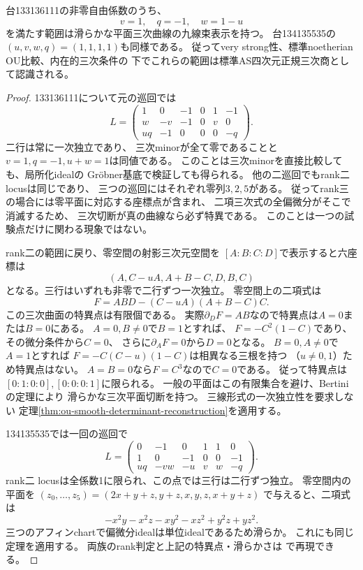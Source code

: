\begin{proposition}[全零空間の次元が増える四零係数型の認識]
\label{prop:ou-four-zero-rank-two-recognition}
台133136111の非零自由係数のうち、
\[
 v=1,\quad q=-1,\quad w=1-u
\]
を満たす範囲は滑らかな平面三次曲線の九線束表示を持つ。
台134135535の$(u,v,w,q)=(1,1,1,1)$も同様である。
従ってvery strong性、標準noetherian OU比較、内在的三次条件の
下でこれらの範囲は標準AS四次元正規三次商として認識される。
\end{proposition}
\begin{proof}
133136111について元の巡回では
\[
 L=\begin{pmatrix}
 1&0&-1&0&1&-1\\
 w&-v&-1&0&v&0\\
 uq&-1&0&0&0&-q
 \end{pmatrix}.
\]
二行は常に一次独立であり、
三次minorが全て零であることと
$v=1,q=-1,u+w=1$は同値である。
このことは三次minorを直接比較しても、局所化idealの
Gröbner基底で検証しても得られる。
他の二巡回でもrank二 locusは同じであり、
三つの巡回にはそれぞれ零列$3,2,5$がある。
従ってrank三の場合には零平面に対応する座標点が含まれ、
二項三次式の全偏微分がそこで消滅するため、
三次切断が真の曲線なら必ず特異である。
このことは一つの試験点だけに関わる現象ではない。

rank二の範囲に戻り、零空間の射影三次元空間を
$[A:B:C:D]$で表示すると六座標は
\[
 (A,C-uA,A+B-C,D,B,C)
\]
となる。三行はいずれも非零で二行ずつ一次独立。
零空間上の二項式は
\[
 F=ABD-(C-uA)(A+B-C)C.
\]
この三次曲面の特異点は有限個である。
実際$\partial_D F=AB$なので特異点は$A=0$または$B=0$にある。
$A=0,B\ne0$で$B=1$とすれば、
$F=-C^2(1-C)$であり、その微分条件から$C=0$、
さらに$\partial_A F=0$から$D=0$となる。
$B=0,A\ne0$で$A=1$とすれば
$F=-C(C-u)(1-C)$は相異なる三根を持つ
（$u\ne0,1$）ため特異点はない。
$A=B=0$なら$F=C^3$なので$C=0$である。
従って特異点は$[0:1:0:0],[0:0:0:1]$に限られる。
一般の平面はこの有限集合を避け、Bertiniの定理により
滑らかな三次平面切断を持つ。
三線形式の一次独立性を要求しない
定理\ref{thm:ou-smooth-determinant-reconstruction}を適用する。

134135535では一回の巡回で
\[
 L=\begin{pmatrix}
 0&-1&0&1&1&0\\
 1&0&-1&0&0&-1\\
 uq&-vw&-u&v&w&-q
 \end{pmatrix}.
\]
rank二 locusは全係数1に限られ、この点では三行は二行ずつ独立。
零空間内の平面を
$(z_0,\ldots,z_5)=(2x+y+z,y+z,x,y,z,x+y+z)$
で与えると、二項式は
\[
 -x^2y-x^2z-xy^2-xz^2+y^2z+yz^2.
\]
三つのアフィンchartで偏微分idealは単位idealであるため滑らか。
これにも同じ定理を適用する。
両族のrank判定と上記の特異点・滑らかさは
で再現できる。
\end{proof}

